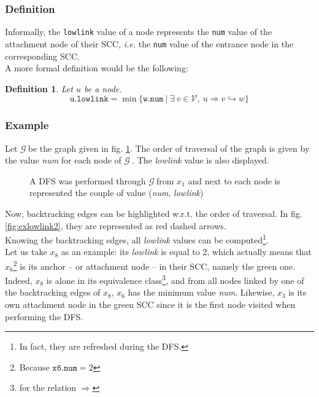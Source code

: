 \documentclass[a4 paper, 12pt]{article}
\def\GG{$\mathcal{G}~$}
\newtheorem{definition}{Definition}
\begin{document}
\subsubsection{Definition}
Informally, the \texttt{lowlink} value of a node represents the \texttt{num} value of the attachment node of their SCC, \textit{i.e.} the \texttt{num} value of the entrance node in the corresponding SCC.\\

A more formal definition would be the following:
\begin{definition}
    Let $u$ be a node.
    \begin{equation*}
        \texttt{u.lowlink} = \min \{\texttt{w.num}~|~\exists~v\in \mathcal{V},~u \Rightarrow v \hookrightarrow w\}
    \end{equation*}
\end{definition}

\subsubsection{Example}
Let \GG be the graph given in fig. \ref{fig:exlowlink}. The order of traversal of the graph is given by the value \textit{num} for each node of \GG. The \textit{lowlink} value is also displayed.

\begin{figure}[!h]
    \caption{A DFS was performed through \GG from $x_1$ and next to each node is represented the couple of value (\textit{num}, \textit{lowlink})\label{fig:exlowlink}}
\end{figure}

Now, backtracking edges can be highlighted w.r.t. the order of traversal. In fig. \ref{fig:exlowlink2}, they are represented as red dashed arrows.\\
Knowing the backtracking edges, all \textit{lowlink} values can be computed\footnote{In fact, they are refreshed during the DFS.}.\\
Let us take $x_8$ as an example: its \textit{lowlink} is equal to 2, which actually means that $x_6$\footnote{Because $\texttt{x6.num} = 2$} is its anchor -- or attachment node -- in their SCC, namely the green one. Indeed, $x_8$ is alone in its equivalence class\footnote{for the relation $\Rightarrow$}, and from all nodes linked by one of the backtracking edges of $x_8$, $x_6$ has the minimum value \textit{num}. Likewise, $x_3$ is its own attachment node in the green SCC since it is the first node visited when performing the DFS.
\end{document}
